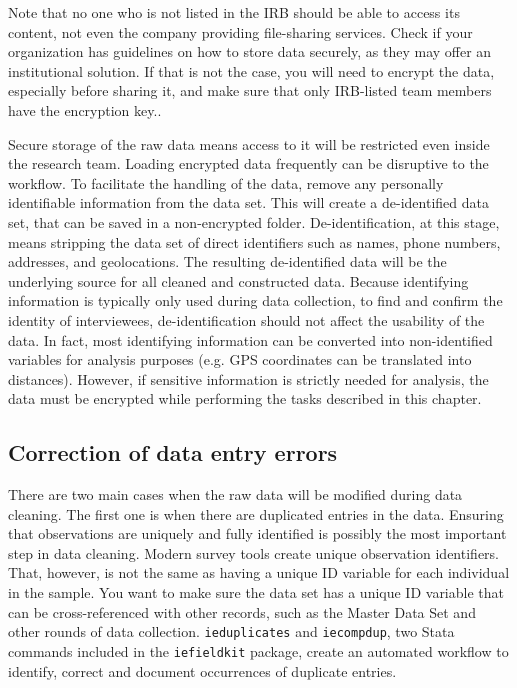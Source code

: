 Note that no one who is not listed in the IRB should be able to access its content, not even the company providing file-sharing services.
Check if your organization has guidelines on how to store data securely, as they may offer an institutional solution. 
If that is not the case, you will need to encrypt the data, especially before
sharing it, and make sure that only IRB-listed team members have the
encryption key..

Secure storage of the raw data means access to it will be restricted even inside the research team.
Loading encrypted data frequently can be disruptive to the workflow.
To facilitate the handling of the data, remove any personally identifiable information from the data set.
This will create a de-identified data set, that can be saved in a non-encrypted folder. 
De-identification,
at this stage, means stripping the data set of direct identifiers such as names, phone numbers, addresses, and geolocations.
The resulting de-identified data will be the underlying source for all cleaned and constructed data.
Because identifying information is typically only used during data collection, 
to find and confirm the identity of interviewees, 
de-identification should not affect the usability of the data.
In fact, most identifying information can be converted into non-identified variables for analysis purposes
(e.g. GPS coordinates can be translated into distances). 
However, if sensitive information is strictly needed for analysis, 
the data must be encrypted while performing the tasks described in this chapter.

\subsection{Correction of data entry errors}

There are two main cases when the raw data will be modified during data cleaning.
The first one is when there are duplicated entries in the data.
Ensuring that observations are uniquely and fully identified
is possibly the most important step in data cleaning.
Modern survey tools create unique observation identifiers.
That, however, is not the same as having a unique ID variable for each individual in the sample.
You want to make sure the data set has a unique ID variable
that can be cross-referenced with other records, such as the Master Data Set
and other rounds of data collection.
\texttt{ieduplicates} and \texttt{iecompdup}, 
two Stata commands included in the \texttt{iefieldkit} 
package,
create an automated workflow to identify, correct and document
occurrences of duplicate entries. 

